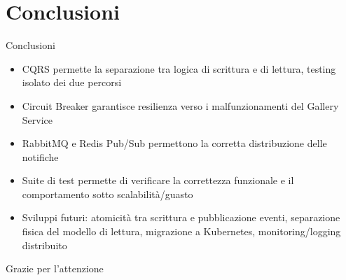 \documentclass[10pt]{beamer}
\begin{document}
\section{Conclusioni}
\begin{frame}{Conclusioni}
\begin{itemize}
    \item CQRS permette la separazione tra logica di scrittura e di lettura, testing isolato dei due percorsi
    \item Circuit Breaker garantisce resilienza verso i malfunzionamenti del Gallery Service
    \item RabbitMQ e Redis Pub/Sub permettono la corretta distribuzione delle notifiche
    \item Suite di test permette di verificare la correttezza funzionale e il comportamento sotto scalabilità/guasto
    \item Sviluppi futuri: atomicità tra scrittura e pubblicazione eventi, separazione fisica del modello di lettura, migrazione a Kubernetes, monitoring/logging distribuito
\end{itemize}
\end{frame}

\begin{frame}
  \centering
  \Large Grazie per l'attenzione
\end{frame}
\end{document}
